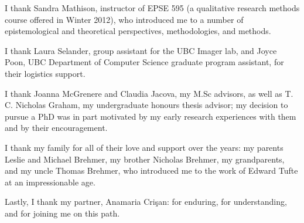 I thank Sandra Mathison, instructor of EPSE 595 (a qualitative research methods course offered in Winter 2012), who introduced me to a number of epistemological and theoretical perspectives, methodologies, and methods.

I thank Laura Selander, group assistant for the UBC Imager lab, and Joyce Poon, UBC Department of Computer Science graduate program assistant, for their logistics support.

I thank Joanna McGrenere and Claudia Jacova, my M.Sc advisors, as well as T. C. Nicholas Graham, my undergraduate honours thesis advisor; my decision to pursue a PhD was in part motivated by my early research experiences with them and by their encouragement. 

I thank my family for all of their love and support over the years: my parents Leslie and Michael Brehmer, my brother Nicholas Brehmer, my grandparents, and my uncle Thomas Brehmer, who introduced me to the work of Edward Tufte at an impressionable age.

Lastly, I thank my partner, Anamaria Cri\c{s}an: for enduring, for understanding, and for joining me on this path.
